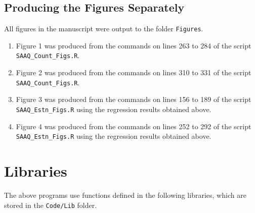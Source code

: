 \documentclass[11pt]{paper}
\begin{document}
\subsection*{Producing the Figures Separately}

All figures in the manuscript were output to the folder \texttt{Figures}.

\begin{enumerate}

\item  Figure 1 was produced from
    the commands on lines 263 to 284 
    of the script \texttt{SAAQ\_Count\_Figs.R}.
\item  Figure 2 was produced from
    the commands on lines 310 to 331 
    of the script \texttt{SAAQ\_Count\_Figs.R}.
\item  Figure 3 was produced from
    the commands on lines 156 to 189 
    of the script \texttt{SAAQ\_Estn\_Figs.R}
    using the regression results obtained above.
\item  Figure 4 was produced from
    the commands on lines 252 to 292 
    of the script \texttt{SAAQ\_Estn\_Figs.R}
    using the regression results obtained above.

\end{enumerate}



\section*{Libraries}


The above programs use functions defined in the following libraries, which are stored in the \texttt{Code/Lib} folder. 
\end{document}
